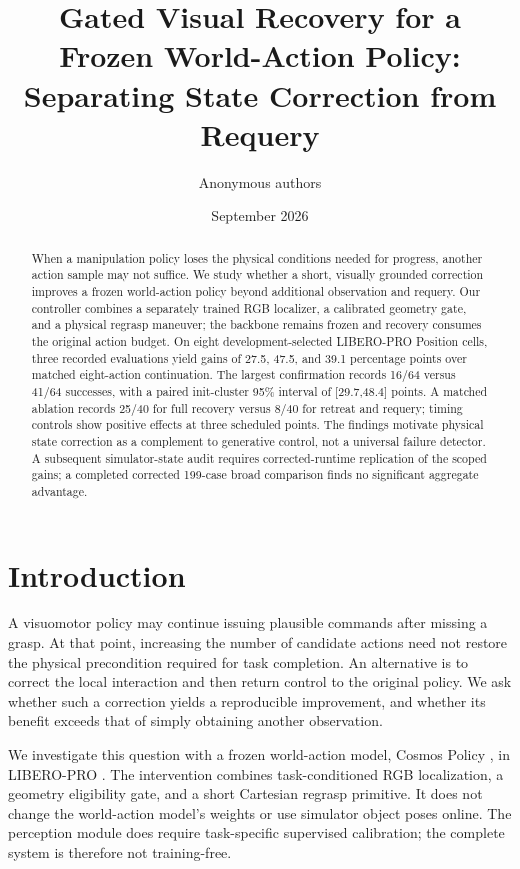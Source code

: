 \documentclass{article}
\title{Gated Visual Recovery for a Frozen World-Action Policy:\\Separating State Correction from Requery}
\author{Anonymous authors}
\date{September 2026}
\begin{document}
\maketitle
\begin{abstract}
When a manipulation policy loses the physical conditions needed for progress,
another action sample may not suffice. We study whether a short, visually
grounded correction improves a frozen world-action policy beyond additional
observation and requery. Our controller combines a separately trained RGB
localizer, a calibrated geometry gate, and a physical regrasp maneuver;
the backbone remains frozen and recovery consumes the original action budget.
On eight development-selected LIBERO-PRO Position cells, three recorded
evaluations yield gains of 27.5, 47.5, and 39.1 percentage points over matched
eight-action continuation. The largest confirmation records 16/64 versus
41/64 successes, with a paired init-cluster 95\% interval of [29.7,48.4] points.
A matched ablation records 25/40 for full recovery versus 8/40 for retreat
and requery; timing controls show positive effects at three scheduled points.
The findings motivate physical state correction as a complement to generative
control, not a universal failure detector. A subsequent simulator-state audit
requires corrected-runtime replication of the scoped gains; a completed
corrected 199-case broad comparison finds no significant aggregate advantage.
\end{abstract}

\section{Introduction}
A visuomotor policy may continue issuing plausible commands after missing a
grasp. At that point, increasing the number of candidate actions need not
restore the physical precondition required for task completion. An alternative
is to correct the local interaction and then return control to the original
policy. We ask whether such a correction yields a reproducible improvement,
and whether its benefit exceeds that of simply obtaining another observation.

We investigate this question with a frozen world-action model,
Cosmos Policy \citep{cosmos_policy}, in LIBERO-PRO \citep{libero_pro}.
The intervention combines task-conditioned RGB localization, a geometry
eligibility gate, and a short Cartesian regrasp primitive. It does not change
the world-action model's weights or use simulator object poses online.
The perception module does require task-specific supervised calibration;
the complete system is therefore not training-free.
\end{document}
